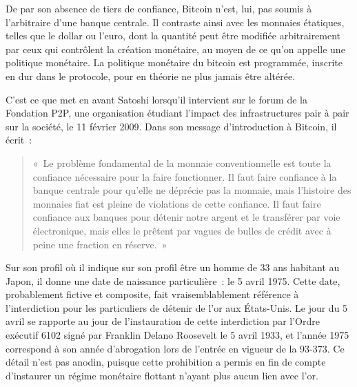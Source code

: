 
De par son absence de tiers de confiance, Bitcoin n'est, lui, pas soumis à l'arbitraire d'une banque centrale. Il contraste ainsi avec les monnaies étatiques, telles que le dollar ou l'euro, dont la quantité peut être modifiée arbitrairement par ceux qui contrôlent la création monétaire, au moyen de ce qu'on appelle une politique monétaire. La politique monétaire du bitcoin est programmée, inscrite en dur dans le protocole, pour en théorie ne plus jamais être altérée.

C'est ce que met en avant Satoshi lorsqu'il intervient sur le forum de la Fondation P2P, une organisation étudiant l'impact des infrastructures pair à pair sur la société, le 11 février 2009. Dans son message d'introduction à Bitcoin, il écrit~:

\begin{quote}
«~Le problème fondamental de la monnaie conventionnelle est toute la confiance nécessaire pour la faire fonctionner. Il faut faire confiance à la banque centrale pour qu'elle ne déprécie pas la monnaie, mais l'histoire des monnaies fiat est pleine de violations de cette confiance. Il faut faire confiance aux banques pour détenir notre argent et le transférer par voie électronique, mais elles le prêtent par vagues de bulles de crédit avec à peine une fraction en réserve.~»
\end{quote}

Sur son profil où il indique sur son profil être un homme de 33 ans habitant au Japon, il donne une date de naissance particulière~: le 5 avril 1975. Cette date, probablement fictive et composite, fait vraisemblablement référence à l'interdiction pour les particuliers de détenir de l'or aux États-Unis. Le jour du 5 avril se rapporte au jour de l'instauration de cette interdiction par l'Ordre exécutif 6102 signé par Franklin Delano Roosevelt le 5 avril 1933, et l'année 1975 correspond à son année d'abrogation lors de l'entrée en vigueur de la  93-373. Ce détail n'est pas anodin, puisque cette prohibition a permis en fin de compte d'instaurer un régime monétaire flottant n'ayant plus aucun lien avec l'or.

